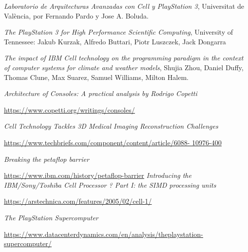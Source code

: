 \documentclass[10pt,compsoc]{IEEEtran}
\begin{document}
	\begin{thebibliography}{1}
	
			{\it{Laboratorio de Arquitecturas Avanzadas con Cell y PlayStation 3}}, Universitat de València, por Fernando Pardo y Jose A. Boluda.\newline
			
			{\it{The PlayStation 3 for High Performance Scientific Computing}}, University of Tennessee: Jakub Kurzak, Alfredo Buttari, Piotr Luszczek, Jack Dongarra\newline
			
			{\it{The impact of IBM Cell technology on the programming paradigm in the context of computer systems	for climate and weather	models}}, Shujia Zhou, Daniel Duffy, Thomas Clune, Max Suarez, 	Samuel Williams, Milton Halem.\newline
			
			{\it{Architecture of Consoles: A practical analysis by Rodrigo Copetti}}
			
			
			\href{https://www.copetti.org/writings/consoles/}{\uline{https://www.copetti.org/writings/consoles/}}\newline
			
			{\it{Cell Technology Tackles 3D Medical Imaging Reconstruction Challenges}}
			
			\href{https://www.techbriefs.com/component/content/article/6088-
				10976-400}{\uline{https://www.techbriefs.com/component/content/article/6088-
					10976-400}}\newline
			
			{\it{Breaking the petaflop barrier}}
			
			\href{https://www.ibm.com/history/petaflop-barrier}{\uline{https://www.ibm.com/history/petaflop-barrier}}\newline
			{\it{Introducing the IBM/Sony/Toshiba Cell Processor ? Part I: the SIMD processing units}}
			
			\href{https://arstechnica.com/features/2005/02/cell-1/}{\uline{https://arstechnica.com/features/2005/02/cell-1/}}\newline
			
			{\it{The PlayStation Supercomputer}}
			
			\href{https://www.datacenterdynamics.com/en/analysis/the-playstation-supercomputer/}{\uline{https://www.datacenterdynamics.com/en/analysis/the\-playstation-supercomputer/}}\newline
			

\end{thebibliography}
\end{document}
